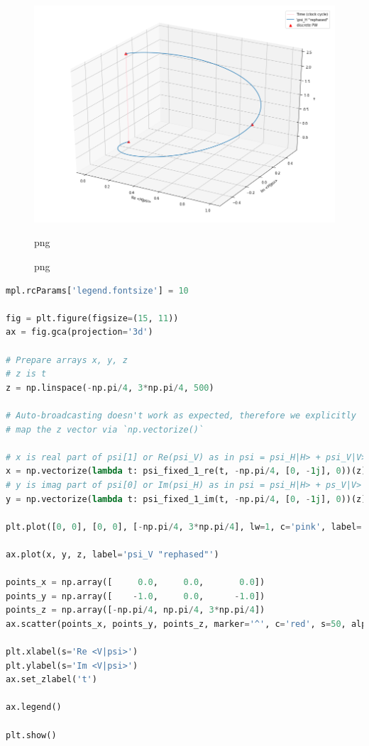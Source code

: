 \begin{figure}
\centering
\includegraphics[width=\textwidth/2]{img/psi_H.png}
\caption[]{png}{png}
\end{figure}

\begin{lstlisting}[language=Python]
mpl.rcParams['legend.fontsize'] = 10

fig = plt.figure(figsize=(15, 11))
ax = fig.gca(projection='3d')

# Prepare arrays x, y, z
# z is t
z = np.linspace(-np.pi/4, 3*np.pi/4, 500)

# Auto-broadcasting doesn't work as expected, therefore we explicitly
# map the z vector via `np.vectorize()`

# x is real part of psi[1] or Re(psi_V) as in psi = psi_H|H> + psi_V|V>
x = np.vectorize(lambda t: psi_fixed_1_re(t, -np.pi/4, [0, -1j], 0))(z)
# y is imag part of psi[0] or Im(psi_H) as in psi = psi_H|H> + ps_V|V>
y = np.vectorize(lambda t: psi_fixed_1_im(t, -np.pi/4, [0, -1j], 0))(z)

plt.plot([0, 0], [0, 0], [-np.pi/4, 3*np.pi/4], lw=1, c='pink', label='Time (clock cycle)')

ax.plot(x, y, z, label='psi_V "rephased"')

points_x = np.array([     0.0,     0.0,       0.0])
points_y = np.array([    -1.0,     0.0,      -1.0])
points_z = np.array([-np.pi/4, np.pi/4, 3*np.pi/4])
ax.scatter(points_x, points_y, points_z, marker='^', c='red', s=50, alpha=1.0, label='discrete PW')

plt.xlabel(s='Re <V|psi>')
plt.ylabel(s='Im <V|psi>')
ax.set_zlabel('t')

ax.legend()

plt.show()
\end{lstlisting}

